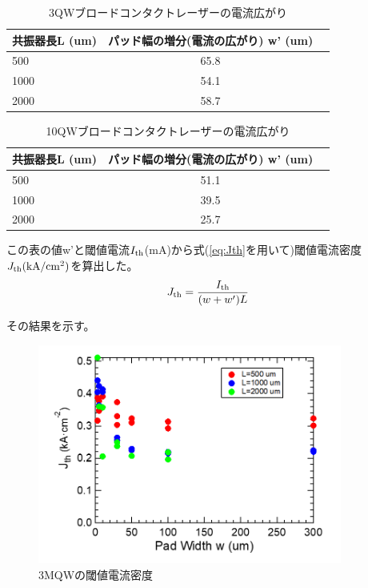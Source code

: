 \begin{table}[hbtp]
  \caption{3QWブロードコンタクトレーザーの電流広がり}
  \label{table_3QW_broadcontact_w_eff}
  \centering
  \begin{tabular}{lcr}
    \hline
    共振器長L (um)  & パッド幅の増分(電流の広がり) w' (um)   \\
    \hline \hline
     500 & 65.8  \\
    1000  & 54.1 \\
    2000  & 58.7 \\ 
    \hline
  \end{tabular}
\end{table}

\begin{table}[hbtp]
  \caption{10QWブロードコンタクトレーザーの電流広がり}
  \label{table_10QW_broadcontact_w_eff}
  \centering
  \begin{tabular}{lcr}
    \hline
    共振器長L (um)  & パッド幅の増分(電流の広がり) w' (um)   \\
    \hline \hline
     500 & 51.1  \\
    1000  & 39.5 \\
    2000  & 25.7 \\ 
    \hline
  \end{tabular}
\end{table}
この表の値w'と閾値電流$I_{\rm{th}}$(mA)から式(\ref{eq:Jth}を用いて)閾値電流密度$J_{\rm{th}} \rm{(kA/cm^2)}$を算出した。
\begin{eqnarray}
J_{\rm{th}}=\dfrac{I_{\rm{th}}}{(w+w')L}
\label{eq:Jth}
\end{eqnarray}

その結果を示す。
\begin{figure}[h]
	\centering
	\includegraphics[width=10cm]{figure/fig_3_1_3QW_broadcontact_Jth.png}
		\caption{3MQWの閾値電流密度}
		\label{fig:fig_3_1_3QW_broadcontact_Ith}
\end{figure}

